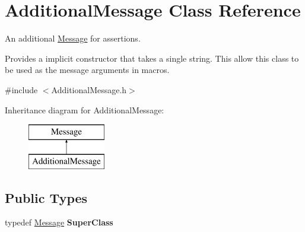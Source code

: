 \hypertarget{class_additional_message}{\section{Additional\-Message Class Reference}
\label{class_additional_message}
}


An additional \hyperlink{class_message}{Message} for assertions.

Provides a implicit constructor that takes a single string. This allow this class to be used as the message arguments in macros.  




{\ttfamily \#include $<$Additional\-Message.\-h$>$}

Inheritance diagram for Additional\-Message\-:\begin{figure}[H]
\begin{center}
\leavevmode
\includegraphics[height=2.000000cm]{class_additional_message}
\end{center}
\end{figure}
\subsection*{Public Types}
\begin{DoxyCompactItemize}
\item 
\hypertarget{class_additional_message_abc8626e28c147b5ddd66032a35676126}{typedef \hyperlink{class_message}{Message} {\bfseries Super\-Class}}\label{class_additional_message_abc8626e28c147b5ddd66032a35676126}

\end{DoxyCompactItemize}
